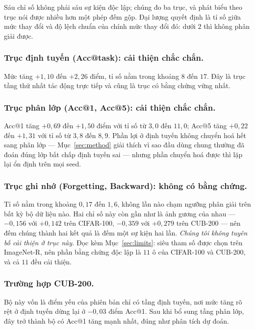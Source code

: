 \documentclass[runningheads]{llncs}
\begin{document}
Sáu chỉ số không phải sáu sự kiện độc lập; chúng đo ba trục, và phát biểu theo
trục nói được nhiều hơn một phép đếm gộp. Đại lượng quyết định là tỉ số giữa mức
thay đổi và độ lệch chuẩn của chính mức thay đổi đó: dưới $2$ thì không phân giải
được.

\subsubsection{Trục định tuyến (Acc@task): cải thiện chắc chắn.}
Mức tăng $+1{,}10$ đến $+2{,}26$ điểm, tỉ số nằm trong khoảng $8$ đến $17$. Đây
là trục tầng thứ nhất tác động trực tiếp và cũng là trục có bằng chứng vững nhất.

\subsubsection{Trục phân lớp (Acc@1, Acc@5): cải thiện chắc chắn.}
Acc@1 tăng $+0{,}69$ đến $+1{,}50$ điểm với tỉ số từ $3{,}0$ đến $11{,}0$; Acc@5
tăng $+0{,}22$ đến $+1{,}31$ với tỉ số từ $3{,}8$ đến $8{,}9$. Phần lợi ở định
tuyến không chuyển hoá hết sang phân lớp --- Mục~\ref{sec:method} giải thích vì
sao đầu dùng chung thường đã đoán đúng lớp bất chấp định tuyến sai --- nhưng phần
chuyển hoá được thì lặp lại ổn định trên mọi seed.

\subsubsection{Trục ghi nhớ (Forgetting, Backward): không có bằng chứng.}
Tỉ số nằm trong khoảng $0{,}17$ đến $1{,}6$, không lần nào chạm ngưỡng phân giải
trên bất kỳ bộ dữ liệu nào. Hai chỉ số này còn gần như là ảnh gương của nhau ---
$-0{,}156$ với $+0{,}142$ trên CIFAR-100, $-0{,}359$ với $+0{,}279$ trên CUB-200
--- nên đếm chúng thành hai kết quả là đếm một sự kiện hai lần. \emph{Chúng tôi
không tuyên bố cải thiện ở trục này.} Đọc kèm Mục~\ref{sec:limits}: siêu tham số
được chọn trên ImageNet-R, nên phần bằng chứng độc lập là $11$ ô của CIFAR-100 và
CUB-200, và cả $11$ đều cải thiện.

\subsubsection{Trường hợp CUB-200.}
Bộ này vốn là điểm yếu của phiên bản chỉ có tầng định tuyến, nơi mức tăng rõ rệt
ở định tuyến dừng lại ở $-0{,}03$ điểm Acc@1. Sau khi bổ sung tầng phân lớp, đây
trở thành bộ có Acc@1 tăng mạnh nhất, đúng như phân tích dự đoán.
\end{document}
